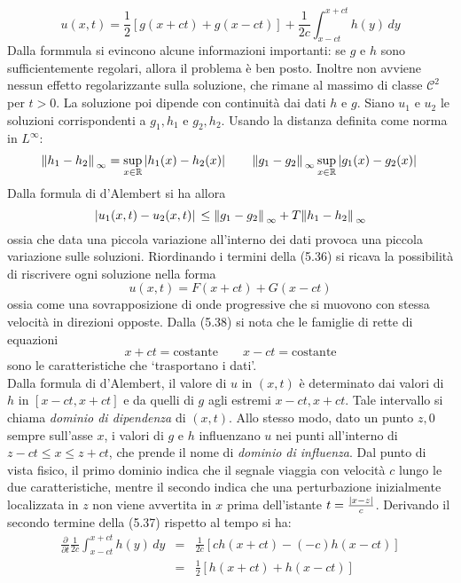 \documentclass[a4paper,12pt, draft]{article}
\theoremstyle{break}
\numberwithin{equation}{section}
\begin{document}
  \begin{equation}
    u(x,t) = \frac{1}{2}[g(x+ct) + g(x-ct)] + \frac{1}{2c}\int_{x-ct}^{x+ct} h(y) \, dy
  \end{equation}
Dalla formmula si evincono alcune informazioni importanti: se \(g\) e \(h\) sono sufficientemente regolari, allora il problema è ben posto. Inoltre non avviene nessun effetto regolarizzante sulla soluzione, che rimane al massimo di classe \(\mathcal{C}^2\) per \(t > 0\). La soluzione poi dipende con continuità dai dati \(h \mbox{ e } g\). Siano \(u_1\) e \(u_2\) le soluzioni corrispondenti a \(g_1, h_1\) e \(g_2, h_2\). Usando la distanza definita come norma in \(L^{\infty}\):
\[
  \norm*{h_1 - h_2}_{\infty} = \sup_{x \in \mathbb{R}} \abs*{h_1(x) - h_2(x)} \qquad \norm*{g_1 - g_2}_{\infty} \sup_{x \in \mathbb{R}}\abs*{g_1(x) - g_2(x)}
\]
Dalla formula di d'Alembert si ha allora
\[
\abs*{u_1(x,t) - u_2(x,t)} \leq \norm*{g_1 - g_2}_{\infty} + T\norm*{h_1 - h_2}_{\infty}  
\]
ossia che data una piccola variazione all'interno dei dati provoca una piccola variazione sulle soluzioni.
Riordinando i termini della (5.36) si ricava la possibilità di riscrivere ogni soluzione nella forma 
\begin{equation}
  u(x,t) = F(x + ct) + G(x-ct)
\end{equation}
ossia come una sovrapposizione di onde progressive che si muovono con stessa velocità in direzioni opposte. Dalla (5.38) si nota che le famiglie di rette di equazioni 
\[
x+ ct = \text{costante}  \qquad  x - ct =\text{costante}
\]
sono le caratteristiche che `trasportano i dati'. \\
Dalla formula di d'Alembert, il valore di \(u\) in \((x,t)\) è determinato dai valori di \(h\) in \([x-ct, x+ct]\) e da quelli di \(g\) agli estremi \(x-ct, x+ct\). Tale intervallo si chiama \emph{dominio di dipendenza} di \((x,t)\). Allo stesso modo, dato un punto \(z, 0\) sempre sull'asse \(x\), i valori di \(g \mbox{ e } h\) influenzano \(u\) nei punti all'interno di \(z - ct \leq x \leq z + ct\), che prende il nome di \emph{dominio di influenza}. Dal punto di vista fisico, il primo dominio indica che il segnale viaggia con velocità \(c\) lungo le due caratteristiche, mentre il secondo indica che una perturbazione inizialmente localizzata in \(z\) non viene avvertita in \(x\) prima dell'istante \(t = \frac{\abs*{x-z}}{c}\).
Derivando il secondo termine della (5.37) rispetto al tempo si ha:
\[
\begin{array}{lcl}
  \frac{\partial}{\partial t}\frac{1}{2c} \int_{x-ct}^{x+ct} h(y) \, dy & = & \frac{1}{2c} [ch(x + ct)-(-c)h(x-ct)] \\
  & = & \frac{1}{2} [h(x + ct) + h(x - ct)]
\end{array}  
\]
\end{document}
